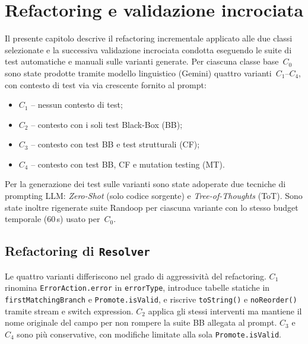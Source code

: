 \section{Refactoring e validazione incrociata}
\label{sec:refactoring}

Il presente capitolo descrive il refactoring incrementale applicato
alle due classi selezionate e la successiva validazione incrociata
condotta eseguendo le suite di test automatiche e manuali sulle
varianti generate. Per ciascuna classe base~$C_0$ sono state prodotte
tramite modello linguistico (Gemini) quattro varianti~$C_1$--$C_4$,
con contesto di test via via crescente fornito al prompt:
\begin{itemize}
  \item \textbf{$C_1$} -- nessun contesto di test;
  \item \textbf{$C_2$} -- contesto con i soli test Black-Box (BB);
  \item \textbf{$C_3$} -- contesto con test BB e test strutturali (CF);
  \item \textbf{$C_4$} -- contesto con test BB, CF e mutation testing (MT).
\end{itemize}
Per la generazione dei test sulle varianti sono state adoperate due
tecniche di prompting LLM: \emph{Zero-Shot} (solo codice sorgente)
e \emph{Tree-of-Thoughts} (ToT). Sono state inoltre rigenerate suite
Randoop per ciascuna variante con lo stesso budget temporale (60\,s)
usato per~$C_0$. 

\subsection{Refactoring di \texttt{Resolver}}

Le quattro varianti differiscono nel grado di aggressività del
refactoring. $C_1$ rinomina \texttt{ErrorAction.error} in
\texttt{errorType}, introduce tabelle statiche in
\texttt{firstMatchingBranch} e \texttt{Promote.isValid}, e riscrive
\texttt{toString()} e \texttt{noReorder()} tramite stream e switch
expression. $C_2$ applica gli stessi interventi ma mantiene il nome
originale del campo per non rompere la suite BB allegata al prompt.
$C_3$ e $C_4$ sono più conservative, con modifiche limitate
alla sola \texttt{Promote.isValid}.

